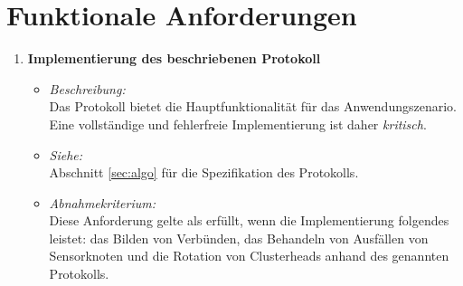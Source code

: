 \section{Funktionale Anforderungen} \label{sec:features}
\begin{enumerate}
\item \textbf{Implementierung des beschriebenen Protokoll}
  \begin{itemize}
  \item \emph{Beschreibung:}\\
    Das Protokoll bietet die Hauptfunktionalit\"at f\"ur das Anwendungszenario. Eine vollst\"andige und fehlerfreie Implementierung ist daher \emph{kritisch}.

  \item \emph{Siehe:}\\
    Abschnitt \ref{sec:algo} f\"ur die Spezifikation des Protokolls.
  \item \emph{Abnahmekriterium:}\\
    Diese Anforderung gelte als erf\"ullt, wenn die Implementierung folgendes leistet: das Bilden von Verb\"unden, das Behandeln von Ausf\"allen von Sensorknoten und die Rotation von Clusterheads anhand des genannten Protokolls.
  \end{itemize}


\end{enumerate}
